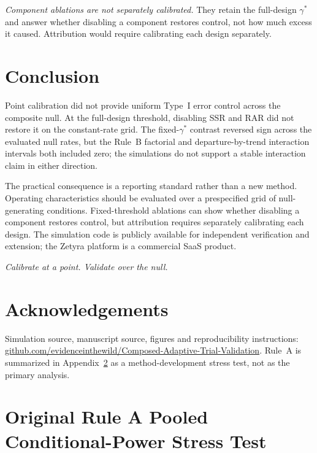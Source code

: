 \documentclass[11pt]{article}
\begin{document}
\emph{Component ablations are not separately calibrated.}  They retain the
full-design $\gamma^*$ and answer whether disabling a component restores
control, not how much excess it caused.  Attribution would require calibrating
each design separately.

\section{Conclusion}

Point calibration did not provide uniform Type~I error control across the
composite null.  At the full-design threshold, disabling SSR and RAR did not
restore it on the constant-rate grid.  The fixed-$\gamma^*$ contrast reversed sign across the
evaluated null rates, but the Rule~B factorial and departure-by-trend
interaction intervals both included zero; the simulations do not support a
stable interaction claim in either direction.

The practical consequence is a reporting standard rather than a new method.
Operating characteristics should be evaluated over a prespecified grid of
null-generating conditions.  Fixed-threshold ablations can show whether
disabling a component restores control, but attribution requires separately
calibrating each design.  The simulation code is publicly available for
independent verification and extension; the Zetyra platform is a commercial
SaaS product.

\medskip\noindent\textit{Calibrate at a point.  Validate over the null.}

\section*{Acknowledgements}

Simulation source, manuscript source, figures and reproducibility instructions:\\
\href{https://github.com/evidenceinthewild/Composed-Adaptive-Trial-Validation}{github.com/evidenceinthewild/Composed-Adaptive-Trial-Validation}.
Rule~A is summarized in Appendix~\ref{app:rule-a} as a method-development
stress test, not as the primary analysis.

\appendix
\section{Original Rule A Pooled Conditional-Power Stress Test}
\label{app:rule-a}
\end{document}
